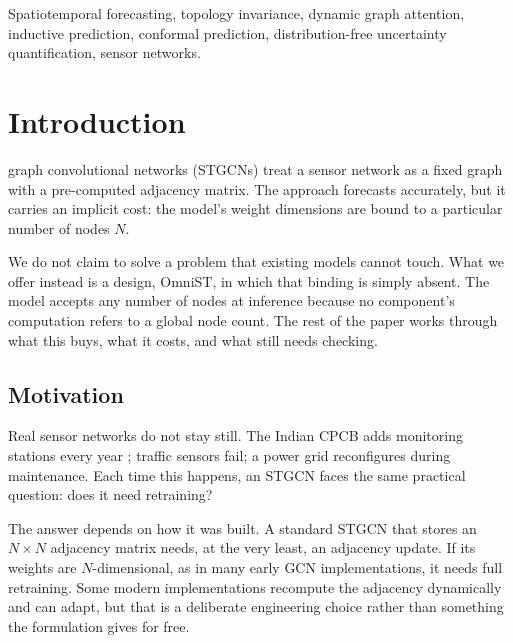 \documentclass[journal]{IEEEtran}
\begin{document}
\begin{abstract}
a direction recent work such as Damba-ST already targets. The contribution is guaranteed inductive uncertainty under dynamic topology, holding over both space and time.
\end{abstract}

\begin{IEEEkeywords}
Spatiotemporal forecasting, topology invariance, dynamic graph attention, inductive prediction, conformal prediction, distribution-free uncertainty quantification, sensor networks.
\end{IEEEkeywords}

\section{Introduction}
\label{sec:introduction}

 graph convolutional networks (STGCNs) \cite{yu2018stgcn} treat a sensor network as a fixed graph with a pre-computed adjacency matrix. The approach forecasts accurately, but it carries an implicit cost: the model's weight dimensions are bound to a particular number of nodes $N$.

We do not claim to solve a problem that existing models cannot touch. What we offer instead is a design, OmniST, in which that binding is simply absent. The model accepts any number of nodes at inference because no component's computation refers to a global node count. The rest of the paper works through what this buys, what it costs, and what still needs checking.

\subsection{Motivation}

Real sensor networks do not stay still. The Indian CPCB adds monitoring stations every year \cite{panja2026estgcn}; traffic sensors fail; a power grid reconfigures during maintenance. Each time this happens, an STGCN faces the same practical question: does it need retraining?

The answer depends on how it was built. A standard STGCN that stores an $N \times N$ adjacency matrix needs, at the very least, an adjacency update. If its weights are $N$-dimensional, as in many early GCN implementations, it needs full retraining. Some modern implementations recompute the adjacency dynamically and can adapt, but that is a deliberate engineering choice rather than something the formulation gives for free.
\end{document}
